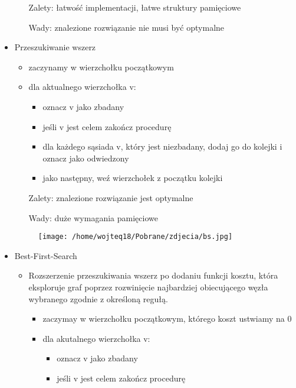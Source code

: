 \documentclass{article}
\begin{document}
\begin{itemize}
\begin{itemize}
                Zalety: łatwość implementacji, łatwe struktury pamięciowe \par
                Wady: znalezione rozwiązanie nie musi być optymalne
        \end{itemize}
    \item Przeszukiwanie wszerz
        \begin{itemize}
            \item zaczynamy w wierzchołku początkowym
            \item dla aktualnego wierzchołka v:
                \begin{itemize}
                    \item oznacz v jako zbadany
                    \item jeśli v jest celem zakończ procedurę
                    \item dla każdego sąsiada v, który jest niezbadany, dodaj go do kolejki i oznacz jako odwiedzony
                    \item jako następny, weź wierzchołek z początku kolejki
                \end{itemize}
                Zalety: znalezione rozwiązanie jest optymalne \par
                Wady: duże wymagania pamięciowe
        \end{itemize}
        \begin{figure}[H]
            \centering
            \texttt{[image: /home/wojteq18/Pobrane/zdjecia/bs.jpg]}
            \label{fig:dfs_image}
        \end{figure}
    \item Best-First-Search
        \begin{itemize}
            \item Rozszerzenie przeszukiwania wszerz po dodaniu funkcji kosztu, która eksploruje graf poprzez rozwinięcie najbardziej obiecującego węzła wybranego zgodnie z określoną regułą.
                \begin{itemize}
                    \item zaczymay w wierzchołku początkowym, którego koszt ustwiamy na 0
                    \item dla akutalnego wierzchołka v:
                        \begin{itemize}
                            \item oznacz v jako zbadany
                            \item jeśli v jest celem zakończ procedurę

\end{itemize}
\end{itemize}
\end{itemize}
\end{itemize}
\end{document}
